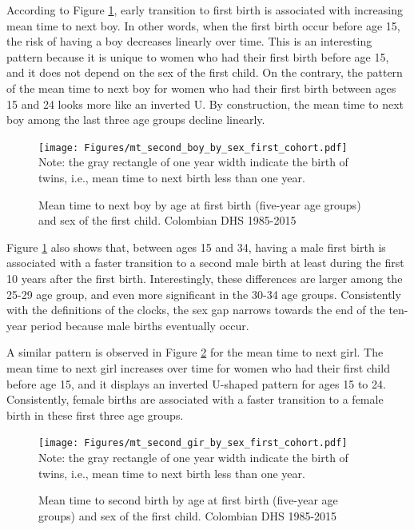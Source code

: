 \documentclass{article}
\begin{document}
According to Figure \ref{fert_02}, early transition to first birth is associated with increasing mean time to next boy. In other words, when the first birth occur before age 15, the risk of having a boy decreases linearly over time. This is an interesting pattern because it is unique to women who had their first birth before age 15, and it does not depend on the sex of the first child. On the contrary, the pattern of the mean time to next boy for women who had their first birth between ages 15 and 24 looks more like an inverted U. By construction, the mean time to next boy among the last three age groups decline linearly.

\begin{figure}[H]
 \centering
    \caption{Mean time to next boy by age at first birth (five-year age groups) and sex of the first child. Colombian DHS 1985-2015}
    \texttt{[image: Figures/mt\_second\_boy\_by\_sex\_first\_cohort.pdf]}\\
    \label{fert_02}
    Note: the gray rectangle of one year width indicate the birth of twins, i.e., mean time to next birth less than one year.
\end{figure}

Figure \ref{fert_02} also shows that, between ages 15 and 34, having a male first birth is associated with a faster transition to a second male birth at least during the first 10 years after the first birth. Interestingly, these differences are larger among the 25-29 age group, and even more significant in the 30-34 age groups. Consistently with the definitions of the clocks, the sex gap narrows towards the end of the ten-year period because male births eventually occur. 

A similar pattern is observed in Figure \ref{fert_03} for the mean time to next girl. The mean time to next girl increases over time for women who had their first child before age 15, and it displays an inverted U-shaped pattern for ages 15 to 24. Consistently, female births are associated with a faster transition to a female birth in these first three age groups.

\begin{figure}[H]
    \centering
    \caption{Mean time to second birth by age at first birth (five-year age groups) and sex of the first child. Colombian DHS 1985-2015}
    \texttt{[image: Figures/mt\_second\_gir\_by\_sex\_first\_cohort.pdf]}\\
    \label{fert_03}
    Note: the gray rectangle of one year width indicate the birth of twins, i.e., mean time to next birth less than one year.
\end{figure}
\end{document}
